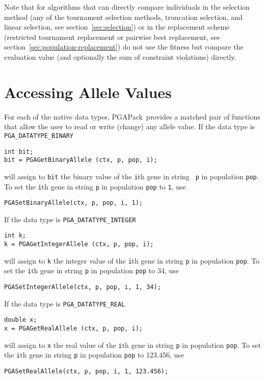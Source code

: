 \documentclass{report}
\newcommand{\pga}{PGAPack}
\begin{document}
Note that for algorithms that can directly compare individuals in the
selection method (any of the tournament selection methods, truncation
selection, and linear selection, see section~\ref{sec:selection}) or in
the replacement scheme (restricted tournament replacement or pairwise
best replacement, see section~\ref{sec:population-replacement}) do not
use the fitness but compare the evaluation value (and optionally the sum
of constraint violations) directly.

\section{Accessing Allele Values}\label{sec:allele-access}

For each of the native data types, \pga\ provides a matched pair of functions
that allow the user to read or write (change) any allele value.  If the data
type is {\tt PGA\_DATATYPE\_BINARY}
\begin{verbatim}
int bit;
bit = PGAGetBinaryAllele (ctx, p, pop, i);
\end{verbatim}
will assign to {\tt bit} the binary value of the {\tt i}th gene in string {\tt
p} in population {\tt pop}.  To set the {\tt i}th gene in string {\tt p} in
population {\tt pop} to {\tt 1}, use
\begin{verbatim}
PGASetBinaryAllele(ctx, p, pop, i, 1);
\end{verbatim}

If the data type is {\tt PGA\_DATATYPE\_INTEGER}
\begin{verbatim}
int k;
k = PGAGetIntegerAllele (ctx, p, pop, i);
\end{verbatim}
will assign to {\tt k} the integer value of the {\tt i}th gene in string
{\tt p} in population {\tt pop}.  
To set the {\tt i}th gene in string
{\tt p} in population {\tt pop} to 34, use
\begin{verbatim}
PGASetIntegerAllele(ctx, p, pop, i, 1, 34);
\end{verbatim}

If the data type is {\tt PGA\_DATATYPE\_REAL}
\begin{verbatim}
double x;
x = PGAGetRealAllele (ctx, p, pop, i);
\end{verbatim}
will assign to {\tt x} the real value of the {\tt i}th gene in string {\tt p}
in population {\tt pop}.
To set the {\tt i}th gene in string
{\tt p} in population {\tt pop} to 123.456, use
\begin{verbatim}
PGASetRealAllele(ctx, p, pop, i, 1, 123.456);
\end{verbatim}
\end{document}
